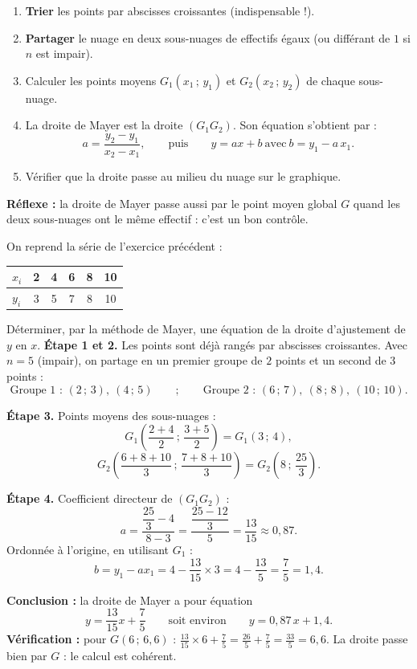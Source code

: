 \documentclass[11pt]{article}
\newcommand{\cle}[1]{{\popxbold\color{popdark}#1}}
\begin{document}
\begin{methode}
\begin{enumerate}
\item \textbf{Trier} les points par abscisses croissantes (indispensable !).
\item \textbf{Partager} le nuage en deux sous-nuages de effectifs égaux (ou différant de $1$ si $n$ est impair).
\item Calculer les points moyens $G_1(x_1\,;\,y_1)$ et $G_2(x_2\,;\,y_2)$ de chaque sous-nuage.
\item La \cle{droite de Mayer} est la droite $(G_1G_2)$. Son équation s'obtient par :
\[ a=\frac{y_2-y_1}{x_2-x_1}, \qquad \text{puis} \qquad y=ax+b \ \text{avec}\ b=y_1-a\,x_1. \]
\item Vérifier que la droite passe \og au milieu \fg{} du nuage sur le graphique.
\end{enumerate}
\textbf{Réflexe :} la droite de Mayer passe aussi par le point moyen global $G$ quand les deux sous-nuages ont le même effectif : c'est un bon contrôle.
\end{methode}

\begin{exoresolu}
On reprend la série de l'exercice précédent :
\begin{center}
\begin{tabular}{|l|*{5}{c|}}
\hline
\rowcolor{popblueL} $x_i$ & 2 & 4 & 6 & 8 & 10 \\
\hline
$y_i$ & 3 & 5 & 7 & 8 & 10 \\
\hline
\end{tabular}
\end{center}
Déterminer, par la méthode de Mayer, une équation de la droite d'ajustement de $y$ en $x$.
\tcblower
\textbf{Étape 1 et 2.} Les points sont déjà rangés par abscisses croissantes. Avec $n=5$ (impair), on partage en un premier groupe de $2$ points et un second de $3$ points :
\[ \text{Groupe 1 : } (2\,;\,3),\ (4\,;\,5) \qquad ; \qquad \text{Groupe 2 : } (6\,;\,7),\ (8\,;\,8),\ (10\,;\,10). \]

\textbf{Étape 3.} Points moyens des sous-nuages :
\[ G_1\left(\frac{2+4}{2}\,;\,\frac{3+5}{2}\right)=G_1(3\,;\,4), \]
\[ G_2\left(\frac{6+8+10}{3}\,;\,\frac{7+8+10}{3}\right)=G_2\left(8\,;\,\frac{25}{3}\right). \]

\textbf{Étape 4.} Coefficient directeur de $(G_1G_2)$ :
\[ a=\frac{\dfrac{25}{3}-4}{8-3}=\frac{\dfrac{25-12}{3}}{5}=\frac{13}{15}\approx 0{,}87. \]
Ordonnée à l'origine, en utilisant $G_1$ :
\[ b=y_1-a x_1=4-\frac{13}{15}\times 3=4-\frac{13}{5}=\frac{7}{5}=1{,}4. \]

\textbf{Conclusion :} la droite de Mayer a pour équation
\[ y=\frac{13}{15}x+\frac{7}{5} \qquad \text{soit environ} \qquad y=0{,}87\,x+1{,}4. \]
\textbf{Vérification :} pour $G(6\,;\,6{,}6)$ : $\frac{13}{15}\times 6+\frac{7}{5}=\frac{26}{5}+\frac{7}{5}=\frac{33}{5}=6{,}6$. La droite passe bien par $G$ : le calcul est cohérent.
\end{exoresolu}
\end{document}
